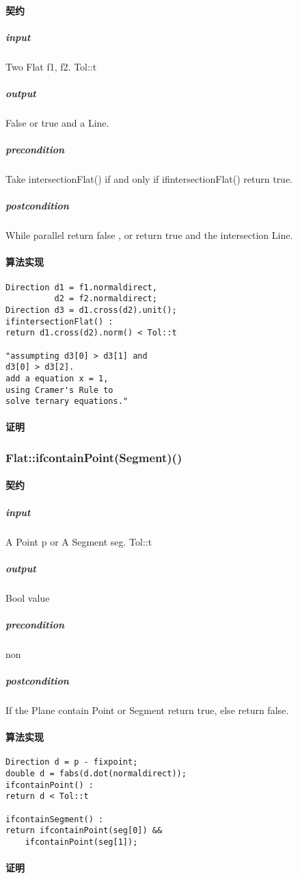 \documentclass[a4paper]{book}
\numberwithin{equation}{chapter}
\theoremstyle{definition}
\begin{document}
\begin{multicols}{2}
\paragraph{契约}
\subparagraph{input}
Two Flat f1, f2. Tol::t
\subparagraph{output}
False or true and a Line. 
\subparagraph{precondition}
Take intersectionFlat() if and only if ifintersectionFlat() return true.
\subparagraph{postcondition}
While parallel return false , or return true and the intersection Line.
\paragraph{算法实现}
\begin{lstlisting}
Direction d1 = f1.normaldirect,
		  d2 = f2.normaldirect;
Direction d3 = d1.cross(d2).unit(); 
ifintersectionFlat() :
return d1.cross(d2).norm() < Tol::t

"assumpting d3[0] > d3[1] and 
d3[0] > d3[2].
add a equation x = 1,
using Cramer's Rule to 
solve ternary equations."

\end{lstlisting}
\paragraph{证明}

\subsubsection{Flat::ifcontainPoint(Segment)()}
\paragraph{契约}
\subparagraph{input}
A Point p or A Segment seg. Tol::t
\subparagraph{output}
Bool value
\subparagraph{precondition}
non
\subparagraph{postcondition}
If the Plane contain Point or Segment return true, else return false.
\paragraph{算法实现}
\begin{lstlisting}
Direction d = p - fixpoint;
double d = fabs(d.dot(normaldirect));
ifcontainPoint() :
return d < Tol::t

ifcontainSegment() : 
return ifcontainPoint(seg[0]) && 
	ifcontainPoint(seg[1]);
\end{lstlisting}
\paragraph{证明}


\end{multicols}
\end{document}
